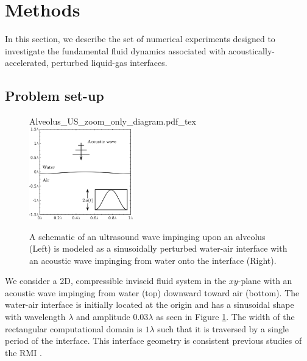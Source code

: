 \section{Methods} \label{sec:methods}%
In this section, we describe the set of numerical experiments designed
to investigate the fundamental fluid dynamics associated with
acoustically-accelerated, perturbed liquid-gas interfaces.

\subsection{Problem set-up}
\label{subsec:setup}
\begin{figure}
  \centering
  \def\svgwidth{0.48\textwidth}
   {Alveolus_US_zoom_only_diagram.pdf_tex} \hfill%
   \includegraphics[width=0.4\textwidth]{./figs/lung_figs/usbe_model_schematic2} \hfill
  \caption[A schematic view of the model problem]{A schematic of an
    ultrasound wave impinging upon an alveolus (Left) is modeled as a sinusoidally perturbed water-air interface with an acoustic wave impinging from water onto the interface (Right).}
  \label{fig:problem_schematic}
\end{figure}
% 
We consider a 2D, compressible inviscid fluid system in the $xy$-plane
with an acoustic wave impinging from water (top) downward toward air
(bottom). The water-air interface is initially located at the origin
and has a sinusoidal shape with wavelength $\lambda$ and amplitude
$0.03\lambda$ as seen in Figure \ref{fig:problem_schematic}. The width
of the rectangular computational domain is $1\lambda$ such that it is
traversed by a single period of the interface. This interface geometry
is consistent previous studies of the \ac{RMI}
\citep{Brouillette2002}.

